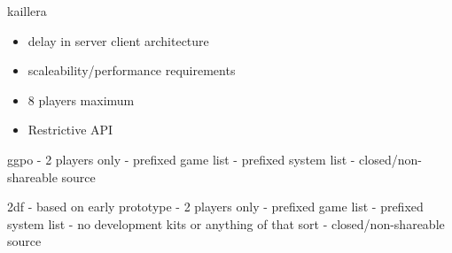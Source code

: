 \documentclass{article}
\begin{document}

kaillera
\begin{itemize}
  \item delay in server client architecture
  \item scaleability/performance requirements
  \item 8 players maximum
  \item Restrictive API %
\end{itemize}
ggpo
 - 2 players only
 - prefixed game list
 - prefixed system list
 - closed/non-shareable source
 
2df
 - based on early prototype
 - 2 players only
 - prefixed game list
 - prefixed system list
 - no development kits or anything of that sort
 - closed/non-shareable source
\end{document}
